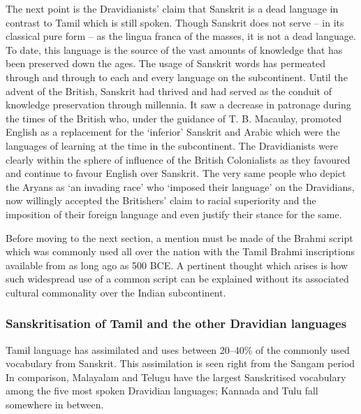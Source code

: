 The next point is the Dravidianists’ claim that Sanskrit is a dead language in contrast to Tamil which is still spoken. Though Sanskrit does not serve – in its classical pure form – as the lingua franca of the masses, it is not a dead language. To date, this language is the source of the vast amounts of knowledge that has been preserved down the ages. The usage of Sanskrit words has permeated through and through to each and every language on the subcontinent. Until the advent of the British, Sanskrit had thrived and had served as the conduit of knowledge preservation through millennia. It saw a decrease in patronage during the times of the British who, under the guidance of T. B. Macaulay, promoted English as a replacement for the ‘inferior’ Sanskrit and Arabic which were the languages of learning at the time in the subcontinent. The Dravidianists were clearly within the sphere of influence of the British Colonialists as they favoured and continue to favour English over Sanskrit. The very same people who depict the Aryans as ‘an invading race’ who ‘imposed their language’ on the Dravidians, now willingly accepted the Britishers’ claim to racial superiority and the imposition of their foreign language and even justify their stance for the same.

Before moving to the next section, a mention must be made of the Brahmi script which was commonly used all over the nation with the Tamil Brahmi inscriptions available from as long ago as 500 BCE. A pertinent thought which arises is how such widespread use of a common script can be explained without its associated cultural commonality over the Indian subcontinent.


\subsubsection*{Sanskritisation of Tamil and the other Dravidian languages}

Tamil language has assimilated and uses between 20–40\% of the commonly used vocabulary from Sanskrit. This assimilation is seen right from the Sangam period In comparison, Malayalam and Telugu have the largest Sanskritised vocabulary among the five most spoken Dravidian languages; Kannada and Tulu fall somewhere in between.

